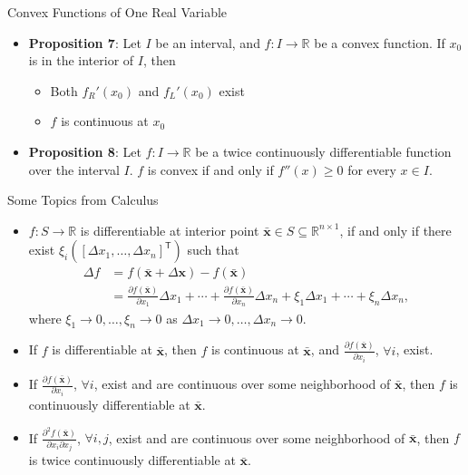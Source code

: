 \documentclass[aspectratio=169,hyperref,UTF8,CJK]{beamer}
\newcommand{\R}{\mathbb{R}}
\newcommand{\trans}{\mathsf{T}}
\newcommand{\vect}[1]{\boldsymbol{#1}}
\begin{document}
\begin{frame}{Convex Functions of One Real Variable}
  \small
  \begin{itemize}
    \item \textbf{Proposition 7}: Let $I$ be an interval, and $f:I\to\R$ be a convex function. If $x_0$ is in the interior of $I$, then
      \begin{itemize}
        \item[(a)] Both $f_R'(x_0)$ and $f_L'(x_0)$ exist
        \item[(b)] $f$ is continuous at $x_0$
      \end{itemize}
    \item \textbf{Proposition 8}: Let $f:I\to\R$ be a twice continuously differentiable function over the interval $I$. $f$ is convex if and only if $f''(x)\ge0$ for every $x\in I$.
  \end{itemize}
\end{frame}

\begin{frame}{Some Topics from Calculus}
  \scriptsize
  \begin{itemize}
    \item $f:S\to\R$ is differentiable at interior point $\bar{\vect{x}}\in S\subseteq\R^{n\times1}$, if and only if there exist $\xi_i([\Delta x_1,\ldots,\Delta x_n]^{\trans})$ such that
      \begin{align*}
        \Delta f&=f(\bar{\vect{x}}+\Delta\vect{x})-f(\bar{\vect{x}})\\
        &=\frac{\partial f(\bar{\vect{x}})}{\partial x_1}\Delta x_1+\cdots+
          \frac{\partial f(\bar{\vect{x}})}{\partial x_n}\Delta x_n+
          \xi_1\Delta x_1+\cdots+\xi_n\Delta x_n,
      \end{align*}
      where $\xi_1\to0,\ldots,\xi_n\to0$ as $\Delta x_1\to0,\ldots,\Delta x_n\to0$.
    \item If $f$ is differentiable at $\bar{\vect{x}}$, then $f$ is continuous at $\bar{\vect{x}}$, and $\frac{\partial f(\bar{\vect{x}})}{\partial x_i}$, $\forall i$, exist.
    \item If $\frac{\partial f(\bar{\vect{x}})}{\partial x_i}$, $\forall i$, exist and are continuous over some neighborhood of $\bar{\vect{x}}$, then $f$ is continuously differentiable at $\bar{\vect{x}}$.
    \item If $\frac{\partial^2 f(\bar{\vect{x}})}{\partial x_i\partial x_j}$, $\forall i,j$, exist and are continuous over some neighborhood of $\bar{\vect{x}}$, then $f$ is twice continuously differentiable at $\bar{\vect{x}}$.
  \end{itemize}
\end{frame}
\end{document}
